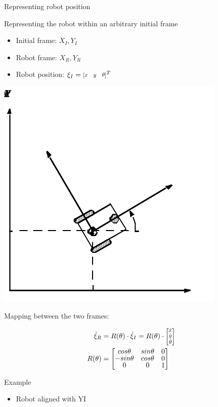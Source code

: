 \documentclass[compress]{beamer}
\newcommand{\colvec}[2][.8]{%
  \scalebox{#1}{%
    \renewcommand{\arraystretch}{.8}%
    $\begin{bmatrix}#2\end{bmatrix}$%
  }
}
\begin{document}
\begin{frame}{Representing robot position}

Representing the robot within an arbitrary initial frame

\begin{itemize}
    \item Initial frame: ${X_I, Y_I}$
    \item Robot frame: ${X_R, Y_R}$
    \item Robot position: $\xi_I = \colvec{x & y & \theta}^T$
\end{itemize}

    \begin{center}
        \includegraphics[width=0.2\linewidth]{robot_position}
    \end{center}

Mapping between the two frames:

    \begin{align*}
        \dot\xi_R &= R(\theta)\cdot \dot\xi_I = R(\theta)\cdot \colvec{\dot{x} \\ \dot{y} \\ \dot\theta} \\ 
        R(\theta) &= \begin{bmatrix} cos\theta & sin\theta & 0 \\
                                    -sin\theta & cos\theta & 0 \\
                                             0 &         0 & 1 \end{bmatrix}
    \end{align*}

\end{frame}

\begin{frame}{Example}

\begin{itemize}
    \item Robot aligned with YI
\end{itemize}

\end{frame}
\end{document}
